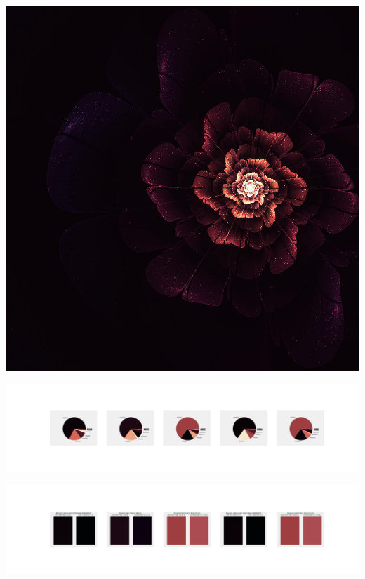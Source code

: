 \documentclass[11pt]{article}
\begin{document}
\begin{landscape}
    \begin{center}
    \includegraphics[width=\textwidth]{./nbimg/file (96).jpg}
    \end{center}

    \begin{center}
    \includegraphics[width=250mm]{./nbimg/pie-447.jpg}
    \end{center}

    \begin{center}
    \includegraphics[width=250mm]{./nbimg/peak-447.jpg}
    \end{center}
    


\end{landscape}
\end{document}
